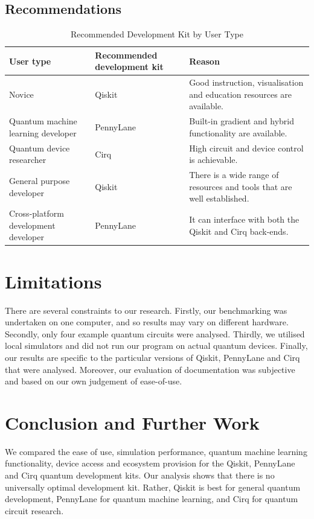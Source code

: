 \documentclass[journal]{IEEEtran}
\begin{document}
\subsection{Recommendations}
\begin{table}[H]
\caption{Recommended Development Kit by User Type}
\label{tab:recs}
\centering
\footnotesize
\setlength{\tabcolsep}{3pt}
\begin{tabularx}{\columnwidth}{>{\raggedright\arraybackslash}p{2.1cm} >{\raggedright\arraybackslash}p{1.9cm} Y}
\toprule
\textbf{User type} & \textbf{Recommended development kit} & \textbf{Reason}\\
\midrule
Novice & Qiskit & Good instruction, visualisation and education resources are available.\\
Quantum machine learning developer & PennyLane & Built-in gradient and hybrid functionality are available.\\
Quantum device researcher & Cirq & High circuit and device control is achievable.\\
General purpose developer & Qiskit & There is a wide range of resources and tools that are well established.\\
Cross-platform development developer & PennyLane & It can interface with both the Qiskit and Cirq back-ends.\\
\bottomrule
\end{tabularx}
\end{table}

\section{Limitations}
There are several constraints to our research. Firstly, our benchmarking was undertaken on one computer, and so results may vary on different hardware. Secondly, only four example quantum circuits were analysed. Thirdly, we utilised local simulators and did not run our program on actual quantum devices. Finally, our results are specific to the particular versions of Qiskit, PennyLane and Cirq that were analysed. Moreover, our evaluation of documentation was subjective and based on our own judgement of ease-of-use.

\section{Conclusion and Further Work}
We compared the ease of use, simulation performance, quantum machine learning functionality, device access and ecosystem provision for the Qiskit, PennyLane and Cirq quantum development kits. Our analysis shows that there is no universally optimal development kit. Rather, Qiskit is best for general quantum development, PennyLane for quantum machine learning, and Cirq for quantum circuit research.
\end{document}
